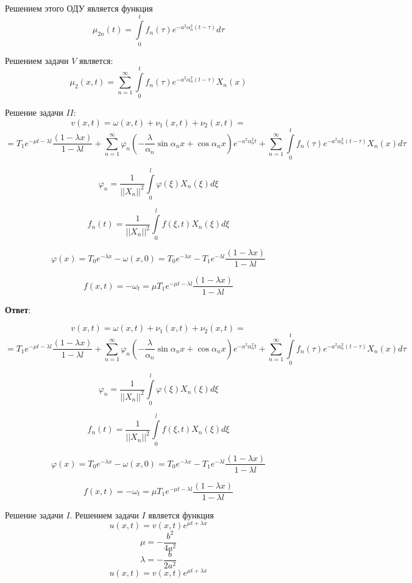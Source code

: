 Решением этого ОДУ является функция
$$ \mu_{2n}(t) = \int\limits_0^t f_{n}(\tau) e^{-a^{2}\alpha_{n}^{2}(t - \tau)} d\tau $$

Решением задачи $V$ является:
$$ \mu_{2}(x, t) = \sum_{n=1}^{\infty} \int\limits_0^t f_{n}(\tau) e^{-a^{2}\alpha_{n}^{2}(t - \tau)}X_{n}(x) $$

Решение задачи $II$:
$$ v(x, t) = \omega(x, t) + \nu_{1}(x, t) + \nu_{2}(x, t) = $$
$$ = T_{1}e^{-\mu t - \lambda l} \dfrac{(1 - \lambda x)}{1 - \lambda l} + \sum_{n=1}^{\infty} \varphi_{n} \left( -\dfrac{\lambda}{\alpha_{n}} \sin{\alpha_{n} x} + \cos{\alpha_{n} x} \right) e^{-a^{2}\alpha_{n}^{2}t} + \sum_{n=1}^{\infty} \int\limits_0^t f_{n}(\tau) e^{-a^{2}\alpha_{n}^{2}(t - \tau)} X_{n}(x)d\tau $$

$$ \varphi_{n} = \dfrac{1}{||X_{n}||^{2}} \int\limits_0^l \varphi(\xi) X_{n}(\xi) d\xi$$

$$ f_{n}(t) = \dfrac{1}{||X_{n}||^{2}} \int\limits_0^l f(\xi, t) X_{n}(\xi) d\xi $$

$$ \varphi(x) = T_{0}e^{-\lambda x} - \omega(x, 0) = T_{0}e^{-\lambda x} - T_{1}e^{-\lambda l} \dfrac{(1 - \lambda x)}{1 - \lambda l}$$

$$ f(x, t) = -\omega_{t} = \mu T_{1}e^{-\mu t - \lambda l} \dfrac{(1 - \lambda x)}{1 - \lambda l} $$

\textbf{Ответ}:

$$ v(x, t) = \omega(x, t) + \nu_{1}(x, t) + \nu_{2}(x, t) = $$
$$ = T_{1}e^{-\mu t - \lambda l} \dfrac{(1 - \lambda x)}{1 - \lambda l} + \sum_{n=1}^{\infty} \varphi_{n} \left( -\dfrac{\lambda}{\alpha_{n}} \sin{\alpha_{n} x} + \cos{\alpha_{n} x} \right) e^{-a^{2}\alpha_{n}^{2}t} + \sum_{n=1}^{\infty} \int\limits_0^t f_{n}(\tau) e^{-a^{2}\alpha_{n}^{2}(t - \tau)} X_{n}(x)d\tau $$

$$ \varphi_{n} = \dfrac{1}{||X_{n}||^{2}} \int\limits_0^l \varphi(\xi) X_{n}(\xi) d\xi$$

$$ f_{n}(t) = \dfrac{1}{||X_{n}||^{2}} \int\limits_0^l f(\xi, t) X_{n}(\xi) d\xi $$

$$ \varphi(x) = T_{0}e^{-\lambda x} - \omega(x, 0) = T_{0}e^{-\lambda x} - T_{1}e^{-\lambda l} \dfrac{(1 - \lambda x)}{1 - \lambda l}$$

$$ f(x, t) = -\omega_{t} = \mu T_{1}e^{-\mu t - \lambda l} \dfrac{(1 - \lambda x)}{1 - \lambda l} $$

Решение задачи $I$. Решением задачи $I$ является функция
$$ u(x, t) = v(x, t) e^{\mu t + \lambda x}$$
$$ \mu = -\dfrac{b^{2}}{4a^{2}}$$
$$ \lambda = -\dfrac{b}{2a^{2}}$$
$$ u(x, t) = v(x, t)e^{\mu t + \lambda x}$$

